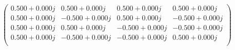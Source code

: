 \documentclass[border=1em]{standalone}
\begin{document}
$
\left(
\begin{array}{cccc}
0.500+0.000j & 0.500+0.000j & 0.500+0.000j & 0.500+0.000j \\
0.500+0.000j & -0.500+0.000j & 0.500+0.000j & -0.500+0.000j \\
0.500+0.000j & 0.500+0.000j & -0.500+0.000j & -0.500+0.000j \\
0.500+0.000j & -0.500+0.000j & -0.500+0.000j & 0.500+0.000j \\
\end{array}
\right)
$
\end{document}
